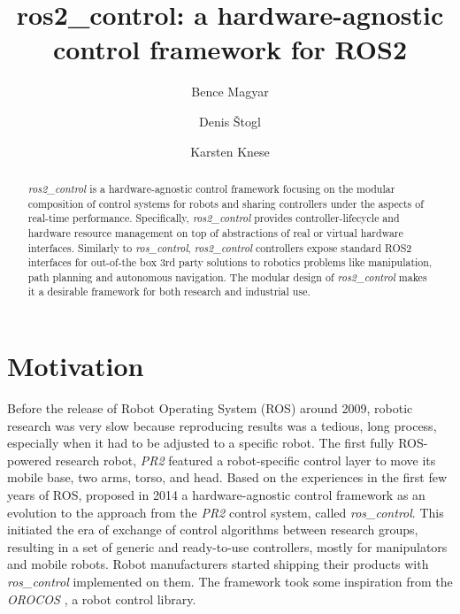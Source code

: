 \documentclass[journal]{IEEEtran}
\begin{document}
%
\title{ros2\_control: a hardware-agnostic control framework for ROS2}
%
%
\author{Bence Magyar \and
Denis Štogl \and
Karsten Knese}

\maketitle              %
%
\begin{abstract}
\emph{ros2\_control} is a hardware-agnostic control framework focusing on the modular composition of control systems for robots and sharing controllers under the aspects of real-time performance.
Specifically, \emph{ros2\_control} provides controller-lifecycle and hardware resource management on top of abstractions of real or virtual hardware interfaces.
Similarly to \emph{ros\_control}, \emph{ros2\_control} controllers expose standard ROS2 interfaces for out-of-the box 3rd
party solutions to robotics problems like manipulation, path planning and autonomous navigation.
The modular design of \emph{ros2\_control} makes it a desirable framework for both research and industrial use.


\end{abstract}
%
%
%
\section{Motivation}


Before the release of Robot Operating System (ROS) \cite{ref_ros} around 2009, robotic research was very slow because reproducing results was a tedious, long process, especially when it had to be adjusted to a specific robot. The first fully ROS-powered research robot, \emph{PR2} featured a robot-specific control layer to move its mobile base, two arms, torso, and head.
Based on the experiences in the first few years of ROS, \cite{ref_roscontrol} proposed in 2014 a hardware-agnostic control framework as an evolution to the approach from the \emph{PR2} control system, called \emph{ros\_control}. This initiated the era of exchange of control algorithms between research groups, resulting in a set of generic and ready-to-use controllers, mostly for manipulators and mobile robots. Robot manufacturers started shipping their products with \emph{ros\_control} implemented on them. The framework took some inspiration from the \emph{OROCOS} \cite{ref_orocos}, a robot control library.
\end{document}

